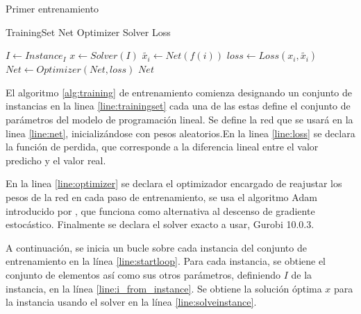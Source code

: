 \documentclass[spanish, a4paper, 12pt, openany,final]{book}
\begin{document}
\begin{algorithm}[H]
	\caption{Primer entrenamiento}\label{alg:training}
	\begin{algorithmic}[1]
		\State TrainingSet  \label{line:trainingset}
		\State Net 		    \label{line:net}
		\State Optimizer    \label{line:optimizer}
		\State Solver       \label{line:solver}
		\State Loss       \label{line:loss}
		
		 \label{line:startloop}
		\State $I \gets Instance_I$ \label{line:i_from_instance}
		\State $x \gets Solver(I)$  \label{line:solveinstance}
		 \label{line:startinnerloop}
		\State $\tilde{x_i} \gets Net(f(i))$   \label{line:prediction}
		\State $loss \gets Loss(x_i,\tilde{x_i})$ \label{line:calculateloss}
		\State $Net \gets Optimizer(Net,loss)$  \label{line:optimizationstep}
		\EndFor \label{line:endinnerloop}
		\EndFor \label{line:endloop}
		\State $Net$  \label{line:trainednet}
	\end{algorithmic}
\end{algorithm}

El algoritmo \ref{alg:training} de entrenamiento comienza designando un conjunto de instancias en la linea \ref{line:trainingset} cada una de las estas define el conjunto de parámetros del modelo de programación lineal. Se define la red que se usará en la linea \ref{line:net}, inicializándose con pesos aleatorios.En la linea \ref{line:loss} se declara la función de perdida, que corresponde a la diferencia lineal entre el valor predicho y el valor real.

En la linea \ref{line:optimizer} se declara el optimizador encargado de reajustar los pesos de la red en cada paso de entrenamiento, se usa el algoritmo Adam introducido por \cite{kingma2017adam}, que funciona como alternativa al descenso de gradiente estocástico. Finalmente se declara el solver exacto a usar, Gurobi 10.0.3.

A continuación, se inicia un bucle sobre cada instancia del conjunto de entrenamiento en la línea \ref{line:startloop}. Para cada instancia,
se obtiene el conjunto de elementos así como sus otros parámetros, definiendo $I$ de la instancia, en la línea \ref{line:i_from_instance}.
Se obtiene la solución óptima $x$ para la instancia usando el solver en la línea \ref{line:solveinstance}.
\end{document}
